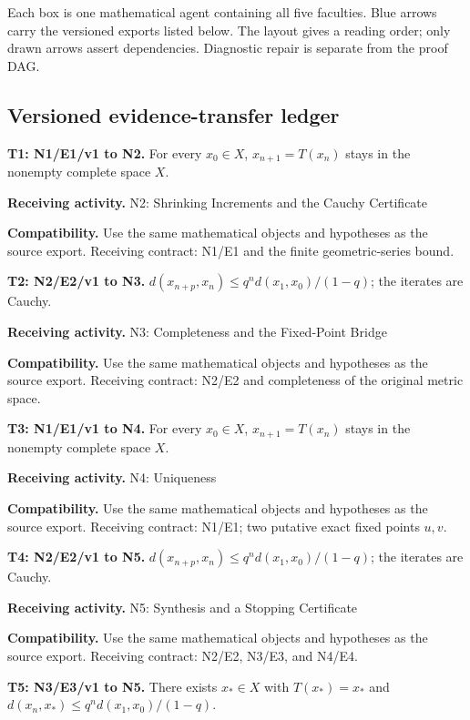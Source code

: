 \documentclass[preprint,12pt,aps,pra,showkeys,amsmath,amssymb,superscriptaddress,floatfix]{revtex4-2}
\theoremstyle{definition}
\theoremstyle{remark}
\newcommand{\field}[2]{\par\smallskip\noindent\textbf{#1.} #2\par}
\begin{document}
Each box is one mathematical agent containing all five faculties. Blue
arrows carry the versioned exports listed below. The layout gives a
reading order; only drawn arrows assert dependencies. Diagnostic repair
is separate from the proof DAG.

\clearpage\subsection{Versioned evidence-transfer ledger}

\begingroup\small\linespread{1.05}\selectfont

\field{T1: N1/E1/v1 to N2}{For every \(x_0\in X\), \(x_{n+1}=T(x_n)\) stays in the nonempty
complete space \(X\).}

\field{Receiving activity}{N2: Shrinking Increments and the Cauchy Certificate}

\field{Compatibility}{Use the same mathematical objects and hypotheses as the source export.
Receiving contract: N1/E1 and the finite geometric-series bound.}

\field{T2: N2/E2/v1 to N3}{\(d(x_{n+p},x_n)\le q^n d(x_1,x_0)/(1-q)\); the iterates are Cauchy.}

\field{Receiving activity}{N3: Completeness and the Fixed-Point Bridge}

\field{Compatibility}{Use the same mathematical objects and hypotheses as the source export.
Receiving contract: N2/E2 and completeness of the original metric space.}

\field{T3: N1/E1/v1 to N4}{For every \(x_0\in X\), \(x_{n+1}=T(x_n)\) stays in the nonempty
complete space \(X\).}

\field{Receiving activity}{N4: Uniqueness}

\field{Compatibility}{Use the same mathematical objects and hypotheses as the source export.
Receiving contract: N1/E1; two putative exact fixed points \(u,v\).}

\field{T4: N2/E2/v1 to N5}{\(d(x_{n+p},x_n)\le q^n d(x_1,x_0)/(1-q)\); the iterates are Cauchy.}

\field{Receiving activity}{N5: Synthesis and a Stopping Certificate}

\field{Compatibility}{Use the same mathematical objects and hypotheses as the source export.
Receiving contract: N2/E2, N3/E3, and N4/E4.}

\field{T5: N3/E3/v1 to N5}{There exists \(x_*\in X\) with \(T(x_*)=x_*\) and
\(d(x_n,x_*)\le q^n d(x_1,x_0)/(1-q)\).}
\end{document}
